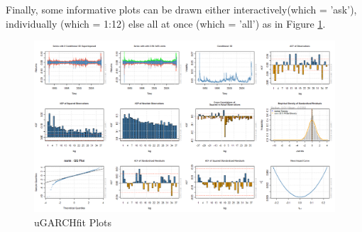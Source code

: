 Finally, some informative plots can be drawn either interactively(which = 'ask'),
individually (which = 1:12) else all at once (which = 'all') as in Figure
\ref{fig:fitplot}.

\begin{landscape}
\begin{figure}[!ht]
\centering
\includegraphics[width=22cm]{fitplot.png}
\caption[uGARCHfit Plots]{uGARCHfit Plots}\label{fig:fitplot}
\end{figure}
\end{landscape}

